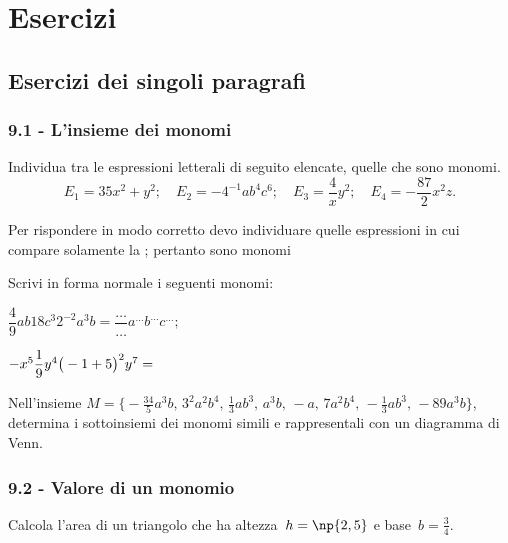 \section{Esercizi}
\subsection{Esercizi dei singoli paragrafi}
\subsubsection*{9.1 - L'insieme dei monomi}
\begin{esercizio}
\label{ese:9.1}
Individua tra le espressioni letterali di seguito elencate, quelle che sono monomi.
\[E_{1}=35x^{2}+y^{2};\quad E_{2}=-4^{-1}ab^{4}c^{6};\quad E_{3}=\dfrac{4}{x}y^{2};\quad E_{4}=-{\frac{87}{2}}x^{2}z.\]

Per rispondere in modo corretto devo individuare quelle espressioni in
cui compare solamente la \dotfill; pertanto sono monomi \dotfill
\end{esercizio}

\begin{esercizio}
\label{ese:9.2}
Scrivi in forma normale i seguenti monomi:
\begin{multicols}{2}
 $\dfrac{4}{9}ab18c^{3}2^{-2}a^{3}b=\dfrac{\ldots }{\ldots }a^{\ldots}b^{\ldots }c^{\ldots };$

 $-x^{5}\dfrac{1}{9}y^{4}\big(-1+5\big)^{2}y^{7}=\dotfill~$
\end{multicols}
\end{esercizio}

\begin{esercizio}
\label{ese:9.3}
Nell'insieme
$M=\big\{-{\frac{34}{5}}a^{3}b\text{,~}3^{2}a^{2}b^{4}\text{,~}\frac{1}{3}ab^{3}\text{,~}a^{3}b\text{,~}-a\text{,~}7a^{2}b^{4}\text{,~}-\frac{1}{3}ab^{3}\text{,~}-89a^{3}b\big\}$,
determina i sottoinsiemi dei monomi simili e rappresentali con un diagramma di Venn.
\end{esercizio}

\subsubsection*{9.2 - Valore di un monomio}

\begin{esercizio}
\label{ese:9.4}
Calcola l'area di un triangolo che ha altezza~$h=\np{2,5}$ e base~$b=\frac{3}{4}$.
\end{esercizio}

